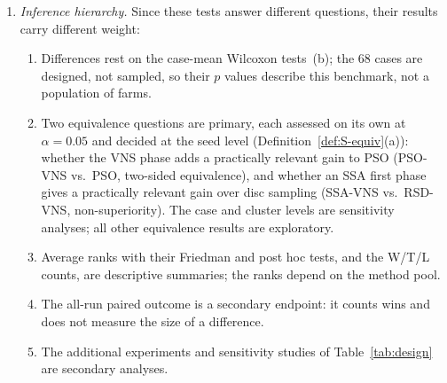 \begin{enumerate}
\begin{enumerate}
\end{enumerate}
\item \emph{Inference hierarchy.} Since these tests answer different questions, their results carry different weight:
\begin{enumerate}
\item[(i)] Differences rest on the case-mean Wilcoxon tests~(b); the 68 cases are designed, not sampled, so their $p$ values describe this benchmark, not a population of farms.
\item[(ii)] Two equivalence questions are primary, each assessed on its own at $\alpha=0.05$ and decided at the seed level (Definition~\ref{def:S-equiv}(a)): whether the VNS phase adds a practically relevant gain to PSO (PSO-VNS vs.\ PSO, two-sided equivalence), and whether an SSA first phase gives a practically relevant gain over disc sampling (SSA-VNS vs.\ RSD-VNS, non-superiority). The case and cluster levels are sensitivity analyses; all other equivalence results are exploratory.
\item[(iii)] Average ranks with their Friedman and post hoc tests, and the W/T/L counts, are descriptive summaries; the ranks depend on the method pool.
\item[(iv)] The all-run paired outcome is a secondary endpoint: it counts wins and does not measure the size of a difference.
\item[(v)] The additional experiments and sensitivity studies of Table~\ref{tab:design} are secondary analyses.
\end{enumerate}
\end{enumerate}

